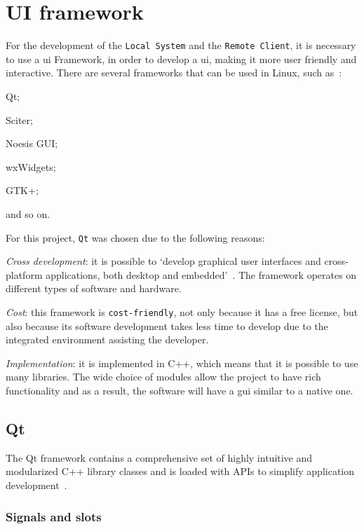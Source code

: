 %
\section{UI framework}
\label{sec:ui-framework}

For the development of the \texttt{Local System} and the \texttt{Remote Client}, it is necessary to use a \gls{ui} Framework, in order to develop a \gls{ui}, making it more user friendly and interactive.
There are several frameworks that can be used in Linux, such as~\cite{ui-lists}:
%
\begin{item-c}
\item Qt;
\item Sciter;
\item Noesis GUI;
\item wxWidgets;
\item GTK+;
\item and so on.
\end{item-c}

For this project, \texttt{Qt} was chosen due to the following reasons:

\begin{item-c}
\item
\emph{Cross development}: it is possible to `develop graphical user interfaces and cross-platform applications, both desktop and embedded'~\cite{qt-bib}.
The framework operates on different types of software and hardware.
\item 
\emph{Cost}:
this framework is \texttt{cost-friendly}, not only because it has a free license, but also because its software development takes less time to develop due to the integrated environment assisting the developer.
\item 
\emph{Implementation}: it is implemented in C++, which means that it is possible to use many libraries.
The wide choice of modules allow the project to have rich functionality and as a result, the software will have a \gls{gui} similar to a native one.
\end{item-c}

\subsection{Qt}

The Qt framework contains a comprehensive set of highly intuitive and modularized C++ library classes and is loaded with APIs to simplify application development~\cite{qt-site}.

\subsubsection{Signals and slots}

